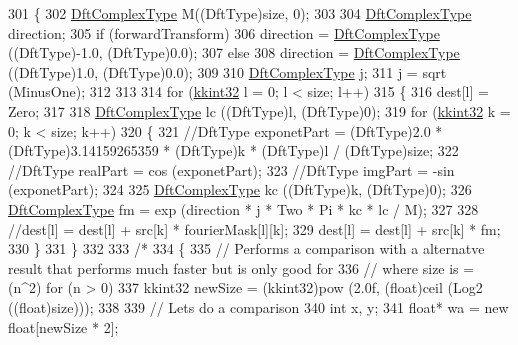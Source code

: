 \begin{DoxyCode}
301   \{
302     \hyperlink{class_k_k_b_1_1_k_k___d_f_t1_d_a4cbc827157dd30ddec2d3753e552a827}{DftComplexType}  M((DftType)size, 0);
303 
304     \hyperlink{class_k_k_b_1_1_k_k___d_f_t1_d_a4cbc827157dd30ddec2d3753e552a827}{DftComplexType} direction;
305     \textcolor{keywordflow}{if}  (forwardTransform)
306       direction = \hyperlink{class_k_k_b_1_1_k_k___d_f_t1_d_a4cbc827157dd30ddec2d3753e552a827}{DftComplexType} ((DftType)-1.0, (DftType)0.0);
307     \textcolor{keywordflow}{else}
308       direction = \hyperlink{class_k_k_b_1_1_k_k___d_f_t1_d_a4cbc827157dd30ddec2d3753e552a827}{DftComplexType} ((DftType)1.0, (DftType)0.0);
309  
310     \hyperlink{class_k_k_b_1_1_k_k___d_f_t1_d_a4cbc827157dd30ddec2d3753e552a827}{DftComplexType}  j;
311     j = sqrt (MinusOne);
312 
313 
314     \textcolor{keywordflow}{for}  (\hyperlink{namespace_k_k_b_a8fa4952cc84fda1de4bec1fbdd8d5b1b}{kkint32}  l = 0;  l < size;  l++)
315     \{
316       dest[l] = Zero;
317 
318       \hyperlink{class_k_k_b_1_1_k_k___d_f_t1_d_a4cbc827157dd30ddec2d3753e552a827}{DftComplexType}  lc ((DftType)l, (DftType)0);
319       \textcolor{keywordflow}{for}  (\hyperlink{namespace_k_k_b_a8fa4952cc84fda1de4bec1fbdd8d5b1b}{kkint32} k = 0;  k < size;  k++)
320       \{
321         \textcolor{comment}{//DftType  exponetPart = (DftType)2.0 * (DftType)3.14159265359 * (DftType)k * (DftType)l /
       (DftType)size;}
322         \textcolor{comment}{//DftType  realPart = cos (exponetPart);}
323         \textcolor{comment}{//DftType  imgPart  = -sin (exponetPart);}
324 
325         \hyperlink{class_k_k_b_1_1_k_k___d_f_t1_d_a4cbc827157dd30ddec2d3753e552a827}{DftComplexType}  kc ((DftType)k, (DftType)0);
326         \hyperlink{class_k_k_b_1_1_k_k___d_f_t1_d_a4cbc827157dd30ddec2d3753e552a827}{DftComplexType}  fm = exp (direction * j * Two * Pi * kc * lc / M);
327 
328         \textcolor{comment}{//dest[l] = dest[l] + src[k] * fourierMask[l][k];}
329         dest[l] = dest[l] + src[k] * fm;
330       \}
331     \}
332   
333     \textcolor{comment}{/*}
334 \textcolor{comment}{    \{}
335 \textcolor{comment}{      // Performs a comparison with a alternatve result that performs much faster but is only good for }
336 \textcolor{comment}{      //  where size is = (n^2) for (n > 0)}
337 \textcolor{comment}{      kkint32  newSize = (kkint32)pow (2.0f, (float)ceil (Log2 ((float)size)));}
338 \textcolor{comment}{}
339 \textcolor{comment}{      // Lets do a comparison}
340 \textcolor{comment}{      int x, y;}
341 \textcolor{comment}{      float* wa = new float[newSize * 2];}

\end{DoxyCode}
